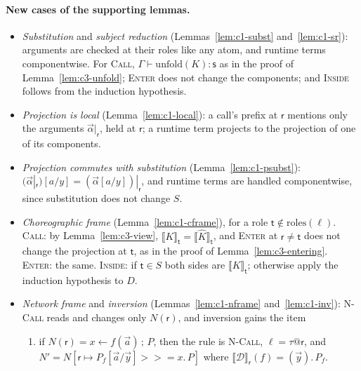 \documentclass[11pt]{report}
\makeatletter
\theoremstyle{plain}
\theoremstyle{definition}
\theoremstyle{remark}
\newcommand{\rr}{\mathsf{r}}
\newcommand{\sr}{\mathsf{s}}
\newcommand{\tr}{\mathsf{t}}
\newcommand{\mbind}[3]{#1 \mathbin{>\!\!>\!\!=} #2.\,#3}
\newcommand{\unfold}[1]{\mathrm{unfold}(#1)}
\newcommand{\roles}[1]{\mathrm{roles}(#1)}
\newcommand{\tauat}[1]{\tau\mathord{@}#1}
\newcommand{\upd}[3]{#1[#2 \mapsto #3]}
\newcommand{\proj}[2]{\llbracket #1 \rrbracket_{#2}}
\newcommand{\projn}[1]{\llbracket #1 \rrbracket}
\newcommand{\Defs}{\mathcal{D}}
\newcommand{\rn}[1]{{\normalfont\scshape #1}}
\makeatother
\begin{document}
\paragraph{New cases of the supporting lemmas.}
\begin{itemize}
\item \emph{Substitution} and \emph{subject reduction}
  (Lemmas~\ref{lem:c1-subst} and~\ref{lem:c1-sr}): arguments are checked at
  their roles like any atom, and runtime terms componentwise.  For \rn{Call},
  $\Gamma\vdash\unfold{K}:\sr$ as in the proof of
  Lemma~\ref{lem:c3-unfold}; \rn{Enter} does not change the components; and
  \rn{Inside} follows from the induction hypothesis.
\item \emph{Projection is local} (Lemma~\ref{lem:c1-local}): a call's prefix
  at $\rr$ mentions only the arguments $\vec\alpha|_\rr$, held at $\rr$; a
  runtime term projects to the projection of one of its components.
\item \emph{Projection commutes with substitution} (Lemma~\ref{lem:c1-psubst}):
  $(\vec\alpha|_\rr)[a/y]=(\vec\alpha[a/y])|_\rr$, and runtime terms are
  handled componentwise, since substitution does not change $S$.
\item \emph{Choreographic frame} (Lemma~\ref{lem:c1-cframe}), for a role
  $\tr\notin\roles{\ell}$.  \rn{Call}: by Lemma~\ref{lem:c3-view},
  $\proj{K}{\tr}=\proj{\widehat{K}}{\tr}$, and \rn{Enter} at $\rr\neq\tr$ does not change
  the projection at $\tr$, as in the proof of Lemma~\ref{lem:c3-entering}.
  \rn{Enter}: the same.  \rn{Inside}: if $\tr\in S$ both sides are
  $\proj{K}{\tr}$; otherwise apply the induction hypothesis to $D$.
\item \emph{Network frame} and \emph{inversion}
  (Lemmas~\ref{lem:c1-nframe} and~\ref{lem:c1-inv}): \rn{N-Call} reads and
  changes only $N(\rr)$, and inversion gains the item
  \begin{enumerate}[label=(\alph*),start=6,nosep]
  \item\label{it:c3-inv-call} if $N(\rr)=x\leftarrow f(\vec a)\,;\,P$, then the
    rule is \rn{N-Call}, $\ell=\tauat{\rr}$, and
    $N'=\upd{N}{\rr}{\mbind{P_f[\vec a/\vec y]}{x}{P}}$ where
    $\projn{\Defs}_\rr(f)=(\vec y).\,P_f$.
  \end{enumerate}
\end{itemize}
\end{document}
